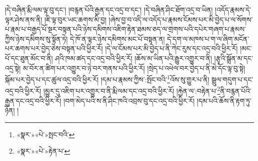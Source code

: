 །དེ་བཞིན་རྨི་ལམ་ལྟ་བུ་དང་། །བརྙན་པོའི་རྒྱན་དང་འདྲ་བ་དང་། །དེ་བཞིན་ཤིང་ཐོག་འདྲ་བ་ཡིན། །འདོད་རྣམས་དེ་ལྟར་ཤེས་ནས་ནི། །ཇི་ལྟ་བུར་ཡང་ཆགས་མི་བྱ། །ཞེས་བྱ་བ་འདི་ལ་འདོད་པ་རྣམས་ངོམས་པར་མི་བྱེད་པ་ལ་སོགས་པ་རྣམ་པ་བརྒྱད་པོ་སྔར་བསྟན་པའི་ཉེས་དམིགས་འཇིག་རྟེན་ཐམས་ཅད་ལ་གྲགས་པའི་དཔེར་གཞག་པ་རྣམས་ཀྱིས་ཉེས་དམིགས་སུ་སྟོན་ཏེ། དེ་ཁོ་ན་ལྟར་ཉེས་དམིགས་མང་པོ་བསྟན་ན། དེ་དག་ལ་མཁས་པ་ག་ལ་ཞིག་མངོན་པར་ཆགས་པར་བྱེད་ཅེས་བསྟན་པའི་ཕྱིར་རོ། །དེ་ལ་ངོམས་པར་མི་བྱེད་པ་ནི་ཀེང་རུས་དང་འདྲ་བའི་ཕྱིར་རོ། །མང་པོ་དང་ཐུན་མོང་བ་ནི། ཤའི་ཁམ་ཚད་དང་འདྲ་བའི་ཕྱིར་རོ། །ཆོས་མ་ཡིན་པའི་རྒྱུར་འགྱུར་བ་ནི། །རྩྭའི་སྒྲོན་མ་དང་འདྲ་སྟེ། མ་བོར་ན་ཚིག་པར་འགྱུར་བ་ཉེ་བར་གནས་པའི་ཕྱིར་རོ། །སྲེད་པ་འཕེལ་བར་བྱེད་པ་ནི་མེ་དོང་ལྟ་བུ་སྟེ། སྐོམ་པར་བྱེད་པ་དང་ཚུལ་འདྲ་བའི་ཕྱིར་རོ། །དམ་པ་རྣམས་ཀྱིས་:སྤོང་བའི་\footnote{«སྣར་»«པེ་»སྤང་བའི་}འོས་སུ་གྱུར་པ་ནི། སྦྲུལ་གདུག་པ་དང་འདྲ་བའི་ཕྱིར་རོ། །མྱུར་དུ་འཇིག་པར་འགྱུར་བ་ནི་རྨི་ལམ་དང་འདྲ་བའི་ཕྱིར་རོ། །རྐྱེན་ལ་:བརྟེན་པ་\footnote{«སྣར་»«པེ་»རྟེན་པ་}ནི་བརྙན་པོའི་རྒྱན་དང་འདྲ་བའི་ཕྱིར་རོ། །བག་མེད་པའི་ས་ནི་ཤིང་ཁའི་འབྲས་བུ་དང་འདྲ་བའི་ཕྱིར་རོ། །དམ་པའི་ཆོས་ནི་རྟག་ཏུ་ཉོན། །
